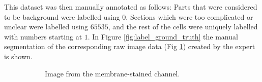 \documentclass[
  digital,     %
  oneside,     %
  nosansbold,  %
  nocolorbold, %
  lof,         %
  lot,         %
]{fithesis4}
\begin{document}
This dataset was then manually annotated as follows: Parts that were considered to be background were labelled using $0$.
Sections which were too complicated or unclear were labelled using $65535$, and
the rest of the cells were uniquely labelled with numbers starting at $1$. In
Figure \ref{fig:label_ground_truth} the manual segmentation of the corresponding raw image data (Fig \ref{fig:label_membrane_channel}) created by the expert is shown.

\begin{figure}
    \begin{subfigure}[t]{0.4\textwidth}
        \centering
        \caption{Image from the membrane-stained channel.}
        \label{fig:label_membrane_channel}
    \end{subfigure}
    \begin{subfigure}[t]{0.4\textwidth}
        \centering

\end{subfigure}
\end{figure}
\end{document}
